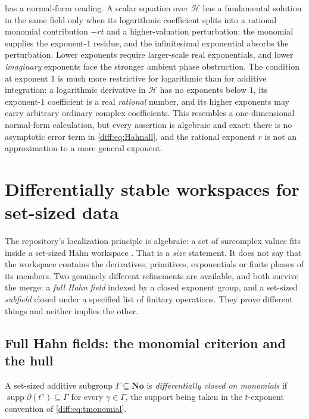 \documentclass[11pt,letterpaper]{article}
\numberwithin{equation}{section}
\theoremstyle{definition}
\theoremstyle{remark}
\newcommand{\No}{\mathbf{No}}
\newcommand{\der}{\partial}
\newcommand{\supp}{\operatorname{supp}}
\newcommand{\Hring}{\mathscr H}
\begin{document}
\begin{remark}
\label{diff:rem:resonant}
 has a normal-form reading. A scalar equation over
$\Hring$ has a fundamental solution in the same field only when its
logarithmic coefficient splits into a rational monomial contribution $-rt$ and
a higher-valuation perturbation: the monomial supplies the exponent-$1$
residue, and the infinitesimal exponential absorbs the perturbation. Lower
exponents require larger-scale real exponentials, and lower \emph{imaginary}
exponents face the stronger ambient phase obstruction. The condition at
exponent $1$ is much more restrictive for logarithmic than for additive
integration: a logarithmic derivative in $\Hring$ has no exponents below $1$,
its exponent-$1$ coefficient is a real \emph{rational} number, and its higher
exponents may carry arbitrary ordinary complex coefficients. This resembles a
one-dimensional normal-form calculation, but every assertion is algebraic and
exact: there is no asymptotic error term in \cref{diff:eq:Hahnall}, and the
rational exponent $r$ is not an approximation to a more general exponent.
\end{remark}
\section{Differentially stable workspaces for set-sized data}
\label{diff:sec:localization}

The repository's localization principle is algebraic: a set of surcomplex
values fits inside a set-sized Hahn workspace \cite{RepoFound}. That is a
\emph{size} statement. It does not say that the workspace contains the
derivatives, primitives, exponentials or finite phases of its members. Two
genuinely different refinements are available, and both survive the merge: a
\emph{full Hahn field} indexed by a closed exponent group, and a set-sized
\emph{subfield} closed under a specified list of finitary operations. They
prove different things and neither implies the other.

\subsection{Full Hahn fields: the monomial criterion and the hull}
\label{diff:sub:hull}

\begin{definition}
\label{diff:def:monomialclosed}
A set-sized additive subgroup $\Gamma\subseteq\No$ is \emph{differentially
closed on monomials} if $\supp\der(t^{\gamma})\subseteq\Gamma$ for every
$\gamma\in\Gamma$, the support being taken in the $t$-exponent convention of
\cref{diff:eq:tmonomial}.
\end{definition}
\end{document}
